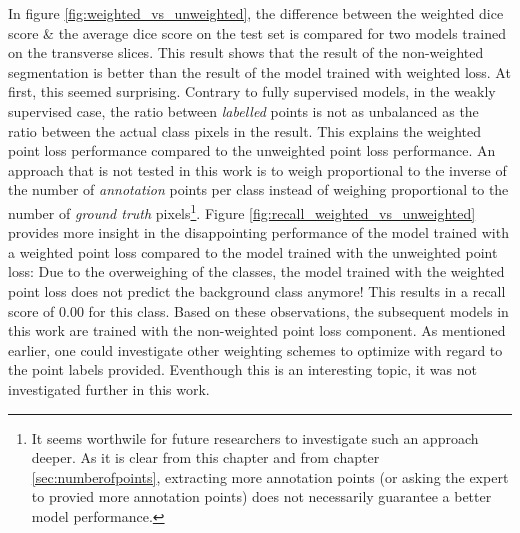 \par{
    In figure \ref{fig:weighted_vs_unweighted}, the difference between the weighted dice score \& the average dice score on the test set is compared for two models trained on the transverse slices.
    This result shows that the result of the non-weighted segmentation is better than the result of the model trained with weighted loss.
    At first, this seemed surprising.
    Contrary to fully supervised models, in the weakly supervised case, the ratio between \textit{labelled} points is not as unbalanced as the ratio between the actual class pixels in the result.
    This explains the weighted point loss performance compared to the unweighted point loss performance.
    An approach that is not tested in this work is to weigh proportional to the inverse of the number of \textit{annotation} points per class instead of weighing proportional to the number of \textit{ground truth} pixels\footnote{
        It seems worthwile for future researchers to investigate such an approach deeper. 
        As it is clear from this chapter and from chapter \ref{sec:numberofpoints}, extracting more annotation points (or asking the expert to provied more annotation points) does not necessarily guarantee a better model performance.
    }.
    Figure \ref{fig:recall_weighted_vs_unweighted} provides more insight in the disappointing performance of the model trained with a weighted point loss compared to the model trained with the unweighted point loss:
    Due to the overweighing of the classes, the model trained with the weighted point loss does not predict the background class anymore! 
    This results in a recall score of 0.00 for this class.
    Based on these observations, the subsequent models in this work are trained with the non-weighted point loss component.
    As mentioned earlier, one could investigate other weighting schemes to optimize with regard to the point labels provided.
    Eventhough this is an interesting topic, it was not investigated further in this work.
}
